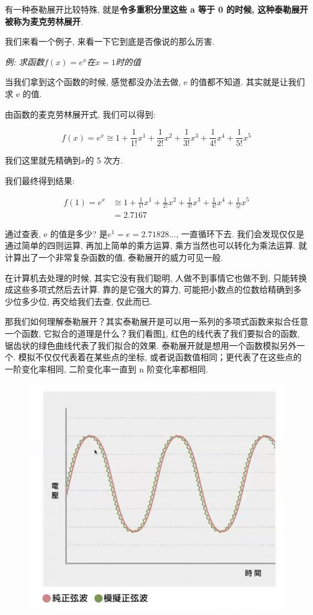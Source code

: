 有一种泰勒展开比较特殊, 就是\textbf{令多重积分里这些 a 等于 0 的时候, 这种泰勒展开被称为麦克劳林展开}. 

我们来看一个例子, 来看一下它到底是否像说的那么厉害. 

\textit{例: 求函数$f(x) = e^x$在$x=1$时的值}

当我们拿到这个函数的时候, 感觉都没办法去做, e 的值都不知道. 其实就是让我们求 e 的值. 

由函数的麦克劳林展开式, 我们可以得到:

\[
  f(x) = e^x \cong 1 + \frac{1}{1!}x^1 + \frac{1}{2!}x^2 + \frac{1}{3!}x^3 +\frac{1}{4!}x^4 + \frac{1}{5!}x^5
\]

我们这里就先精确到$x$的 5 次方. 

我们最终得到结果: 

\begin{align*}
  f(1) = e^x & \cong 1 + \frac{1}{1!}x^1 + \frac{1}{2!}x^2 + \frac{1}{3!}x^3 +\frac{1}{4!}x^4 + \frac{1}{5!}x^5 \\
  & = 2.7167
\end{align*}

通过查表, e 的值是多少? 是$e^1 = e = 2.71828...$, 一直循环下去. 我们会发现仅仅是通过简单的四则运算, 再加上简单的乘方运算, 乘方当然也可以转化为乘法运算. 就计算出了一个非常复杂函数的值, 泰勒展开的威力可见一般. 

在计算机去处理的时候, 其实它没有我们聪明, 人做不到事情它也做不到, 只能转换成这些多项式然后去计算. 靠的是它强大的算力, 可能把小数点的位数给精确到多少位多少位, 再交给我们去查, 仅此而已. 

那我们如何理解泰勒展开？其实泰勒展开是可以用一系列的多项式函数来拟合任意一个函数, 它拟合的道理是什么？我们看图\ref{fig:img14_6}, 红色的线代表了我们要拟合的函数, 锯齿状的绿色曲线代表了我们拟合的效果. 泰勒展开就是想用一个函数模拟另外一个. 模拟不仅仅代表着在某些点的坐标, 或者说函数值相同；更代表了在这些点的一阶变化率相同, 二阶变化率一直到 n 阶变化率都相同. 

\begin{figure}[ht]
  \centering
  \includegraphics[width=0.8\linewidth]{asset/20230904180649.png}
  \caption{}
  \label{fig:img14_6}
\end{figure}

